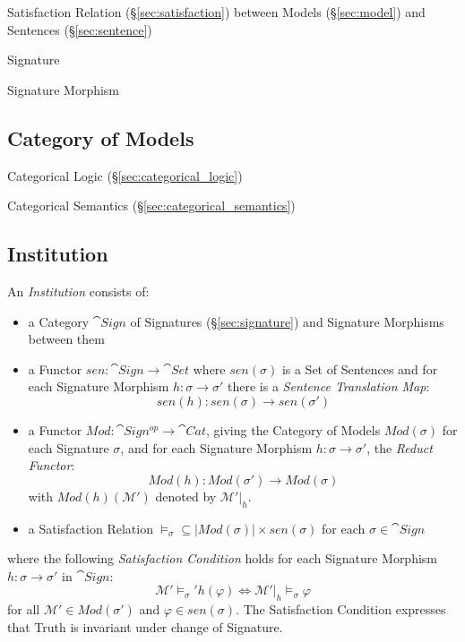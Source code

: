 Satisfaction Relation (\S\ref{sec:satisfaction}) between Models
(\S\ref{sec:model}) and Sentences (\S\ref{sec:sentence})

Signature

Signature Morphism



\subsection{Category of Models}\label{sec:category_of_models}

Categorical Logic (\S\ref{sec:categorical_logic})

Categorical Semantics (\S\ref{sec:categorical_semantics})



\subsection{Institution}\label{sec:institution}

An \emph{Institution} consists of:

\begin{itemize}
\item a Category $\cat{Sign}$ of Signatures (\S\ref{sec:signature})
  and Signature Morphisms between them
\item a Functor $sen : \cat{Sign} \rightarrow \cat{Set}$ where
  $sen(\sigma)$ is a Set of Sentences and for each Signature Morphism
  $h : \sigma \rightarrow \sigma'$ there is a \emph{Sentence
  Translation Map}:
  \[
  sen(h) : sen(\sigma) \rightarrow sen(\sigma')
  \]
\item a Functor $Mod : \cat{Sign^{op}} \rightarrow \cat{Cat}$,
  giving the Category of Models $Mod (\sigma)$ for each Signature
  $\sigma$, and for each Signature Morphism $h : \sigma \rightarrow
  \sigma'$, the \emph{Reduct Functor}:
  \[
  Mod(h) : Mod(\sigma') \rightarrow Mod(\sigma)
  \]
  with $Mod(h)(\mathcal{M}')$ denoted by $\mathcal{M}'|_h$.
\item a Satisfaction Relation $\models_\sigma \subseteq |Mod(\sigma)|
  \times sen(\sigma)$ for each $\sigma \in \cat{Sign}$
\end{itemize}
where the following \emph{Satisfaction Condition} holds for each
Signature Morphism $h : \sigma \rightarrow \sigma'$ in
$\cat{Sign}$:
\[
  \mathcal{M}' \models_\sigma' h(\varphi) \Leftrightarrow
  \mathcal{M}'|_h \models_\sigma \varphi
\]
for all $\mathcal{M}' \in Mod(\sigma')$ and $\varphi \in sen(\sigma)$.
The Satisfaction Condition expresses that Truth is invariant under
change of Signature.



